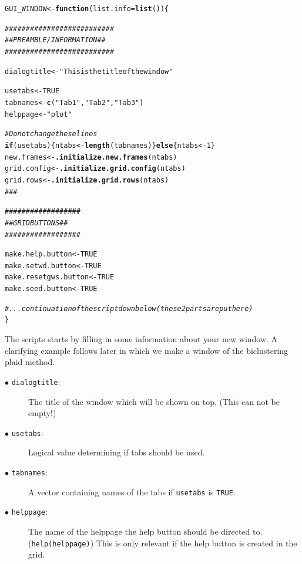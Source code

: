 \documentclass[a4paper]{article}\usepackage[]{graphicx}\usepackage[]{color}
\makeatletter
\newcommand{\hlnum}[1]{\textcolor[rgb]{0.686,0.059,0.569}{#1}}%
\newcommand{\hlstr}[1]{\textcolor[rgb]{0.192,0.494,0.8}{#1}}%
\newcommand{\hlcom}[1]{\textcolor[rgb]{0.678,0.584,0.686}{\textit{#1}}}%
\newcommand{\hlstd}[1]{\textcolor[rgb]{0.345,0.345,0.345}{#1}}%
\newcommand{\hlkwa}[1]{\textcolor[rgb]{0.161,0.373,0.58}{\textbf{#1}}}%
\newcommand{\hlkwb}[1]{\textcolor[rgb]{0.69,0.353,0.396}{#1}}%
\newcommand{\hlkwc}[1]{\textcolor[rgb]{0.333,0.667,0.333}{#1}}%
\newcommand{\hlkwd}[1]{\textcolor[rgb]{0.737,0.353,0.396}{\textbf{#1}}}%
\newenvironment{kframe}{%
 \def\at@end@of@kframe{}%
 \ifinner\ifhmode%
  \def\at@end@of@kframe{\end{minipage}}%
  \begin{minipage}{\columnwidth}%
 \fi\fi%
 \def\FrameCommand##1{\hskip\@totalleftmargin \hskip-\fboxsep
 \colorbox{shadecolor}{##1}\hskip-\fboxsep
     \hskip-\linewidth \hskip-\@totalleftmargin \hskip\columnwidth}%
 \MakeFramed {\advance\hsize-\width
   \@totalleftmargin\z@ \linewidth\hsize
   \@setminipage}}%
 {\par\unskip\endMakeFramed%
 \at@end@of@kframe}
\newenvironment{knitrout}{}{} %
\makeatother
\begin{document}
\begin{knitrout}
\color{fgcolor}\begin{kframe}
\begin{alltt}
\hlstd{GUI_WINDOW} \hlkwb{<-} \hlkwa{function}\hlstd{(}\hlkwc{list.info}\hlstd{=}\hlkwd{list}\hlstd{())\{}

        \hlcom{##########################}
        \hlcom{## PREAMBLE/INFORMATION ##}
        \hlcom{##########################}

        \hlstd{dialogtitle} \hlkwb{<-} \hlstr{"This is the title of the window"}

        \hlstd{usetabs} \hlkwb{<-} \hlnum{TRUE}
        \hlstd{tabnames} \hlkwb{<-} \hlkwd{c}\hlstd{(}\hlstr{"Tab 1"}\hlstd{,}\hlstr{"Tab 2"}\hlstd{,}\hlstr{"Tab 3"}\hlstd{)}
        \hlstd{helppage} \hlkwb{<-} \hlstr{"plot"}

        \hlcom{# Do not change these lines}
        \hlkwa{if}\hlstd{(usetabs)\{ntabs} \hlkwb{<-} \hlkwd{length}\hlstd{(tabnames)\}} \hlkwa{else} \hlstd{\{ntabs} \hlkwb{<-} \hlnum{1}\hlstd{\}}
        \hlstd{new.frames} \hlkwb{<-} \hlkwd{.initialize.new.frames}\hlstd{(ntabs)}
        \hlstd{grid.config} \hlkwb{<-} \hlkwd{.initialize.grid.config}\hlstd{(ntabs)}
        \hlstd{grid.rows} \hlkwb{<-} \hlkwd{.initialize.grid.rows}\hlstd{(ntabs)}
        \hlcom{###}

        \hlcom{##################}
        \hlcom{## GRID BUTTONS ##}
        \hlcom{##################}

        \hlstd{make.help.button} \hlkwb{<-} \hlnum{TRUE}
        \hlstd{make.setwd.button} \hlkwb{<-} \hlnum{TRUE}
        \hlstd{make.resetgws.button} \hlkwb{<-} \hlnum{TRUE}
        \hlstd{make.seed.button} \hlkwb{<-} \hlnum{TRUE}

        \hlcom{# ... continuation of the script down below (these 2 parts are put here)	}
\hlstd{\}}
\end{alltt}
\end{kframe}
\end{knitrout}
\noindent The scripts starts by filling in some information about your
new window. A clarifying example follows later in which we make a window of the
biclustering plaid method.
\begin{description}
  \item[$\bullet$ \texttt{dialogtitle}:] The title of the window which will be
  shown on top. (This can not be empty!)
  
  \item[$\bullet$ \texttt{usetabs}:] Logical value determining if tabs should be
  used.
  \item[$\bullet$ \texttt{tabnames}:] A vector containing names of the tabs if
  \verb|usetabs| is \verb|TRUE|. 
  
  \item[$\bullet$ \texttt{helppage}:] The name of the helppage the help button
  should be directed to. (\verb|help(helppage)|) This is only relevant if the
  help button is created in the grid.
\end{description}
\end{document}
